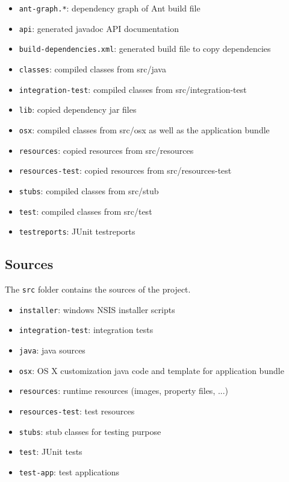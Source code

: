 \documentclass[11pt,a4paper]{article}
\begin{document}
\begin{itemize}
 \item \texttt{ant-graph.*}: dependency graph of Ant build file
 \item \texttt{api}: generated javadoc API documentation
 \item \texttt{build-dependencies.xml}: generated build file to copy dependencies
 \item \texttt{classes}: compiled classes from src/java
 \item \texttt{integration-test}: compiled classes from src/integration-test
 \item \texttt{lib}: copied dependency jar files
 \item \texttt{osx}: compiled classes from src/osx as well as the application bundle
 \item \texttt{resources}: copied resources from src/resources
 \item \texttt{resources-test}: copied resources from src/resources-test
 \item \texttt{stubs}: compiled classes from src/stub
 \item \texttt{test}: compiled classes from src/test
 \item \texttt{testreports}: JUnit testreports
\end{itemize}


\subsection{Sources}
The \texttt{src} folder contains the sources of the project.

\begin{itemize}
 \item \texttt{installer}: windows NSIS installer scripts
 \item \texttt{integration-test}: integration tests
 \item \texttt{java}: java sources
 \item \texttt{osx}: OS X customization java code and template for application bundle
 \item \texttt{resources}: runtime resources (images, property files, ...)
 \item \texttt{resources-test}: test resources
 \item \texttt{stubs}: stub classes for testing purpose
 \item \texttt{test}: JUnit tests
 \item \texttt{test-app}: test applications
\end{itemize}
\end{document}

